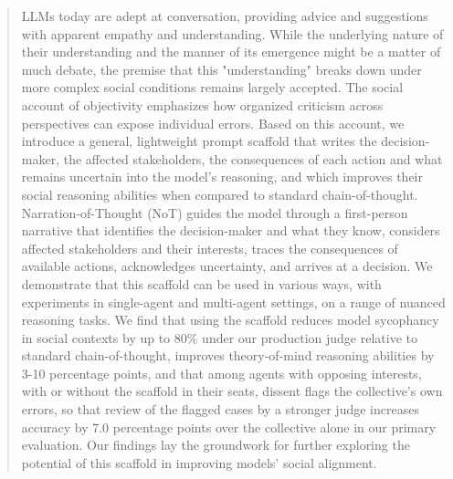 \begin{abstract}
LLMs today are adept at conversation, providing advice and suggestions with apparent empathy and understanding. While the underlying nature of their understanding and the manner of its emergence might be a matter of much debate, the premise that this "understanding" breaks down under more complex social conditions remains largely accepted. The social account of objectivity emphasizes how organized criticism across perspectives can expose individual errors. Based on this account, we introduce a general, lightweight prompt scaffold that writes the decision-maker, the affected stakeholders, the consequences of each action and what remains uncertain into the model's reasoning, and which improves their social reasoning abilities when compared to standard chain-of-thought.
 Narration-of-Thought (NoT) guides the model through a first-person narrative that identifies the decision-maker and what they know, considers affected stakeholders and their interests, traces the consequences of available actions, acknowledges uncertainty, and arrives at a decision. We demonstrate that this scaffold can be used in various ways, with experiments in single-agent and multi-agent settings, on a range of nuanced reasoning tasks. We find that using the scaffold reduces model sycophancy in social contexts by up to 80\% under our production judge relative to standard chain-of-thought,
improves theory-of-mind reasoning abilities by 3-10 percentage points,
and that among agents with opposing interests, with or without the scaffold in their seats, dissent flags the collective's own errors, so that review of the flagged cases by a stronger judge increases accuracy by 7.0 percentage points over the collective alone in our primary evaluation.
Our findings lay the groundwork for further exploring the potential of this scaffold in improving models' social alignment.
\end{abstract}
\noindent{}
